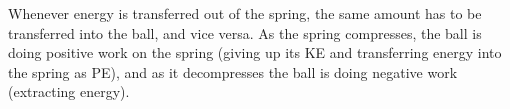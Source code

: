 Whenever energy is transferred out of the spring, the same amount has to be transferred into the ball, and vice
versa. As the spring compresses, the ball is doing positive work on the spring (giving up its KE and transferring
energy into the spring as PE), and as it decompresses the ball is doing negative work (extracting energy).




